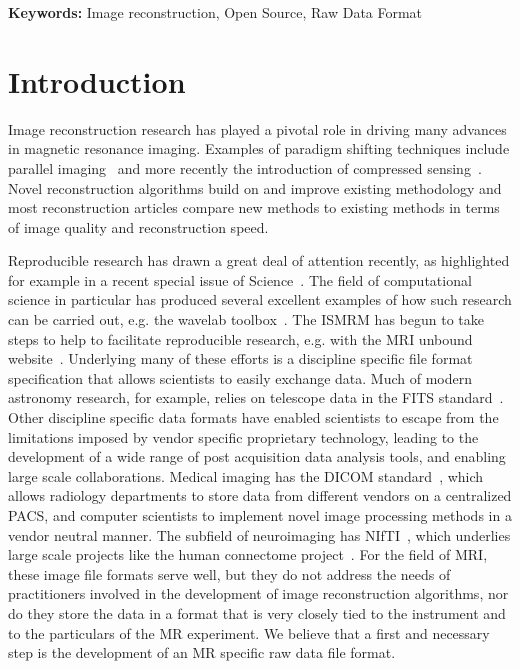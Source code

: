 \documentclass[12pt]{article}
\begin{document}
\textbf{Keywords:}  Image reconstruction, Open Source, Raw Data Format

\newpage
\clearpage
\onecolumn

\section*{Introduction}
Image reconstruction research has played a pivotal role in driving many advances in magnetic resonance imaging. Examples of paradigm shifting techniques include parallel imaging~\cite{Pruessmann:1999uq, Sodickson:1997fk, Griswold:2002kx}  and more recently the introduction of compressed sensing~\cite{Donoho:2006compressed, Lustig:2007vn}. Novel reconstruction algorithms build on and improve existing methodology and most reconstruction articles compare new methods to existing methods in terms of image quality and reconstruction speed.

Reproducible research has drawn a great deal of attention recently, as highlighted for example in a recent special issue of Science~\cite{Jasny:2011again, Peng:2011reproducible}. The field of computational science in particular has produced several excellent examples of how such research can be carried out, e.g. the wavelab toolbox~\cite{wavelab}.  The ISMRM has begun to take steps to help to facilitate reproducible research, e.g. with the MRI unbound website~\cite{mri_unbound}. Underlying many of these efforts is a discipline specific file format specification that allows scientists to easily exchange data.  Much of modern astronomy research, for example, relies on telescope data in the FITS standard~\cite{fits}.  Other discipline specific data formats have enabled scientists to escape from the limitations imposed by vendor specific proprietary technology, leading to the development of a wide range of post acquisition data analysis tools, and enabling large scale collaborations.  Medical imaging has the DICOM standard~\cite{dicom}, which allows radiology departments to store data from different vendors on a centralized PACS, and computer scientists to implement novel image processing methods in a vendor neutral manner. The subfield of neuroimaging has NIfTI~\cite{nifti}, which underlies large scale projects like the human connectome project~\cite{connectome}.  For the field of MRI, these image file formats serve well, but they do not address the needs of practitioners involved in the development of image reconstruction algorithms, nor do they store the data in a format that is very closely tied to the instrument and to the particulars of the MR experiment. We believe that a first and necessary step is the development of an MR specific raw data file format.
\end{document}
